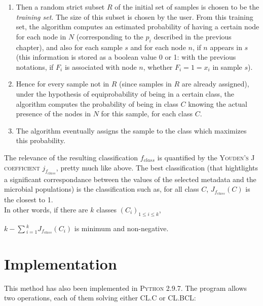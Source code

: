 \documentclass{report}
\begin{document}
\begin{enumerate}
\item Then a random strict subset $R$ of the initial set of samples is chosen to be the \emph{training set}. The size of this subset is chosen by the user. From this training set, the algorithm computes an estimated probability of having a certain node for each node in $N$ (corresponding to the $p_{i}$ described in the previous chapter), and also for each sample $s$ and for each node $n$, if $n$ appears in $s$ (this information is stored as a boolean value 0 or 1: with the previous notations, if $F_{i}$ is associated with node $n$, whether $F_{i} = 1 = x_{i}$ in sample $s$).

\item Hence for every sample not in $R$ (since samples in $R$ are already assigned), under the hypothesis of equiprobability of being in a certain class, the algorithm computes the probability of being in class $C$ knowing the actual presence of the nodes in $N$ for this sample, for each class $C$. 

\item The algorithm eventually assigns the sample to the class which maximizes this probability.

\end{enumerate}

The relevance of the resulting classification $f_{class}$ is quantified by the \textsc{Youden's J coefficient} $j_{f_{class}}$, pretty much like above. The best classification (that hightlights a significant correspondance between the values of the selected metadata and the microbial populations) is the classification such as, for all class $C$, $J_{f_{class}}(C)$ is the closest to 1.\\

In other words, if there are $k$ classes $(C_{i})_{1 \le i \le k}$,\\

\begin{center}
$k - \sum{_{i = 1}^{k}}{J_{f_{class}}(C_{i})}$ is minimum and non-negative.
\end{center}

\section{Implementation}

This method has also been implemented in \textsc{Python 2.9.7}. The program allows two operations, each of them solving either \textsc{CL.C} or \textsc{CL.BCL}:\\
\end{document}

